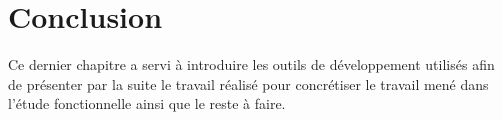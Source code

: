 \section*{Conclusion}
Ce dernier chapitre a servi à introduire les outils de développement utilisés afin de présenter par la suite le travail réalisé pour concrétiser le travail mené dans l’étude fonctionnelle ainsi que le reste à faire.